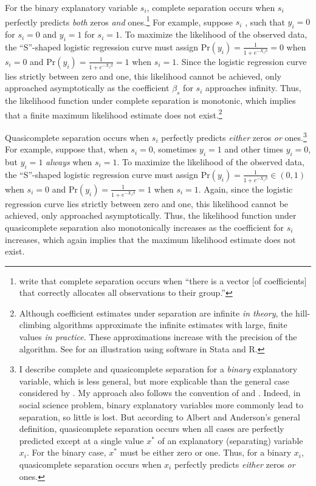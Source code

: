 \documentclass[12pt]{article}
\begin{document}
For the binary explanatory variable $s_i$, complete separation occurs when $s_i$ perfectly predicts \emph{both} zeros \emph{and} ones.\footnote{\citet[p. 38]{AlbertAnderson1984} write that complete separation occurs when ``there is a vector [of coefficients] that correctly allocates all observations to their group.''} For example, suppose $s_i$ , such that $y_i = 0$ for $s_i = 0$ and $y_i = 1$ for $s_i = 1$. To maximize the likelihood of the observed data, the ``S''-shaped logistic regression curve must assign $\text{Pr}(y_i) = \frac{1}{1 + e^{-X_i\beta}} = 0$ when $s_i  = 0$ and $\text{Pr}(y_i) = \frac{1}{1 + e^{-X_i\beta}} = 1$ when $s_i = 1$. Since the logistic regression curve lies strictly between zero and one, this likelihood cannot be achieved, only approached asymptotically as the coefficient $\beta_s$ for $s_i$ approaches infinity. Thus, the likelihood function under complete separation is monotonic, which implies that a finite maximum likelihood estimate does not exist.\footnote{Although coefficient estimates under separation are infinite \emph{in theory}, the hill-climbing algorithms approximate the infinite estimates with large, finite values \emph{in practice}. These approximations increase with the precision of the algorithm. See \cite{Zorn2005} for an illustration using software in Stata and R.}

Quasicomplete separation occurs when $s_i$ perfectly predicts \emph{either} zeros \emph{or} ones.\footnote{I describe complete and quasicomplete separation for a \textit{binary} explanatory variable, which is less general, but more explicable than the general case considered by \cite{AlbertAnderson1984}. My approach also follows the convention of \cite{HeinzeSchemper2002} and \cite{Zorn2005}. Indeed, in social science problem, binary explanatory variables more commonly lead to separation, so little is lost. But according to Albert and Anderson's general definition, quasicomplete separation occurs when all cases are perfectly predicted except at a single value $x^*$ of an explanatory (separating) variable $x_i$. For the binary case, $x^*$ must be either zero or one. Thus, for a binary $x_i$, quasicomplete separation occurs when $x_i$ perfectly predicts \emph{either} zeros \emph{or} ones.} For example, suppose that,  when $s_i = 0$, sometimes $y_i = 1$ and other times $y_i = 0$, but $y_i = 1$ \emph{always} when $s_i = 1$. To maximize the likelihood of the observed data, the ``S''-shaped logistic regression curve must assign $\text{Pr}(y_i) = \frac{1}{1 + e^{-X_i\beta}} \in (0, 1)$ when $s_i  = 0$ and $\text{Pr}(y_i) = \frac{1}{1 + e^{-X_i\beta}} = 1$ when $s_i = 1$. Again, since the logistic regression curve lies strictly between zero and one, this likelihood cannot be achieved, only approached asymptotically. Thus, the likelihood function under quasicomplete separation also monotonically increases as the coefficient for $s_i$ increases, which again implies that the maximum likelihood estimate does not exist.
\end{document}
